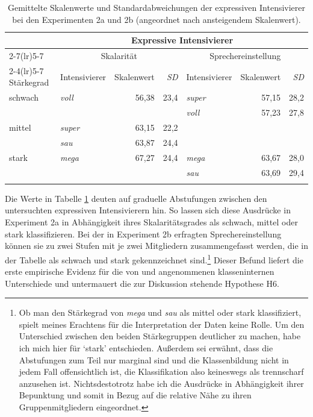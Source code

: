 %
\begin{table}
\small
\begin{tabularx}{\textwidth}{X@{} lrr lrr }
\lsptoprule
 &  \multicolumn{6}{c}{\textbf{Expressive Intensivierer}}  \\
\cmidrule(lr){2-7}\cmidrule(lr){5-7}
& \multicolumn{3}{c}{{Skalarität}} & \multicolumn{3}{c}{{Sprechereinstellung}}  \\
\cmidrule(lr){2-4}\cmidrule(lr){5-7}
{Stärkegrad}  & Intensivierer & Skalenwert& \textit{SD}  & Intensivierer & Skalenwert& \textit{SD}   \\
\midrule

schwach & \textit{voll} & 56,38& 23,4  & \textit{super} & 57,15& 28,2   \\
 &  &  & & \textit{voll} & 57,23 & 27,8\\
\multicolumn{1}{l}{mittel} & \textit{super} & 63,15& 22,2 & \textit{} & \\
  \multicolumn{1}{l}{} & \textit{sau} & 63,87& 24,4 & & \\
stark & \textit{mega} & 67,27& 24,4  & \textit{mega} & 63,67& 28,0   \\
  &  & &  & \textit{sau} & 63,69 & 29,4  \\
\lspbottomrule
\end{tabularx}
\caption[Gemittelte Skalenwerte und Standardabweichungen der expressiven Intensivierer bei den {Experimenten 2a und 2b}]{Gemittelte Skalenwerte und Standardabweichungen der expressiven Intensivierer bei den Experimenten 2a und 2b (angeordnet nach ansteigendem Skalenwert).}
\label{exIn}
\end{table}

Die Werte in Tabelle \ref{exIn} deuten auf graduelle Abstufungen zwischen den untersuchten expressiven Intensivierern hin. So lassen sich diese Ausdrücke in {Experiment 2a} in Abhängigkeit ihres Skalaritätsgrades als schwach, mittel oder stark klassifizieren. Bei der in {Experiment 2b} erfragten {Sprechereinstellung} können sie zu zwei Stufen mit je zwei Mitgliedern zusammengefasst werden, die in der Tabelle als schwach und stark gekennzeichnet sind.\footnote{Ob man den Stärkegrad von \textit{mega} und \textit{sau} als mittel oder stark klassifiziert, spielt meines Erachtens für die Interpretation der Daten keine Rolle. Um den Unterschied zwischen den beiden Stärkegruppen deutlicher zu machen, habe ich mich hier für `stark' entschieden. Außerdem sei erwähnt, dass die Abstufungen zum Teil nur marginal sind und die Klassenbildung nicht in jedem Fall offensichtlich ist, die Klassifikation also keineswegs als trennscharf anzusehen ist. Nichtsdestotrotz habe ich die Ausdrücke in Abhängigkeit ihrer Bepunktung und somit in Bezug auf die relative Nähe zu ihren Gruppenmitgliedern eingeordnet.} Dieser Befund liefert die erste empirische Evidenz für die von \citet[87]{Biedermann.1969} und {\citet[408]{Breindl.2007}} angenommenen klasseninternen Unterschiede und untermauert die zur Diskussion stehende {Hypothese H6}.


